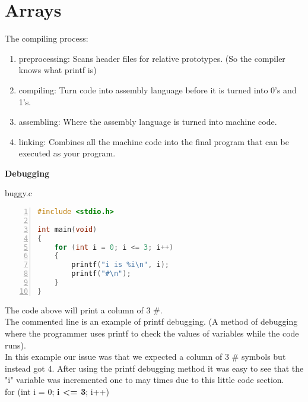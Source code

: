 \documentclass[12pt, letterpaper]{report}
\begin{document}
\chapter{Arrays}

The compiling process:

\begin{enumerate}
	\item preprocessing: Scans header files for relative prototypes. (So the compiler knows what printf is)
	\item compiling: Turn code into assembly language before it is turned into 0's and 1's.
	\item assembling: Where the assembly language is turned into machine code.
	\item linking: Combines all the machine code into the final program that can be executed as your program.
\end{enumerate}

\textbf{Debugging}

buggy.c
\begin{lstlisting}[language=C,numbers=left,framexleftmargin=5mm,frame=single,xleftmargin=18pt]
#include <stdio.h>

int main(void)
{
	for (int i = 0; i <= 3; i++)
	{
		printf("i is %i\n", i);
		printf("#\n");
	}
}
\end{lstlisting}
The code above will print a column of 3 \#.\\
The commented line is an example of printf debugging. (A method of debugging where the programmer uses printf to check the values of variables while the code runs).\\
In this example our issue was that we expected a column of 3 \# symbols but instead got 4. After using the printf debugging method it was easy to see that the "i" variable 
was incremented one to may times due to this little code section. \\
for (int i = 0; \textbf{i <= 3}; i++)
\end{document}
